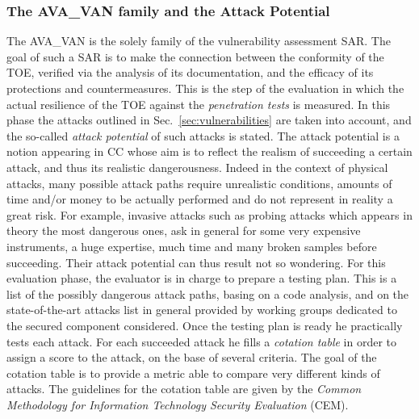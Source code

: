 \subsubsection{The AVA\_VAN family and the Attack Potential}
The AVA\_VAN is the solely family of the vulnerability assessment SAR. The goal of such a SAR is to make the connection between the conformity of the TOE, verified via the analysis of its documentation, and the efficacy of its protections and countermeasures. This is the step of the evaluation in which the actual resilience of the TOE against the \emph{penetration tests} is measured. In this phase the attacks outlined in Sec.~\ref{sec:vulnerabilities} are taken into account, and the so-called \emph{attack potential} of such attacks is stated. The attack potential is a notion appearing in CC whose aim is to reflect the realism of succeeding a certain attack, and thus its realistic dangerousness. Indeed in the context of physical attacks, many possible attack paths require unrealistic conditions, amounts of time and/or money to be actually performed and do not represent in reality a great risk. For example, invasive attacks such as probing attacks which appears in theory the most dangerous ones, ask in general for some very expensive instruments, a huge expertise, much time and many broken samples before succeeding. Their attack potential can thus result not so wondering. For this evaluation phase, the evaluator is in charge to prepare a testing plan. This is a list of the possibly dangerous attack paths, basing on a code analysis, and on the state-of-the-art attacks list in general provided by working groups dedicated to the secured component considered. Once the testing plan is ready he practically tests each attack. For each succeeded attack he fills a \emph{cotation table} in order to assign a score to the attack, on the base of several criteria. The goal of the cotation table is to provide a metric able to compare very different kinds of attacks. The guidelines for the cotation table are given by the \emph{Common Methodology for Information Technology Security Evaluation} (CEM). \\

